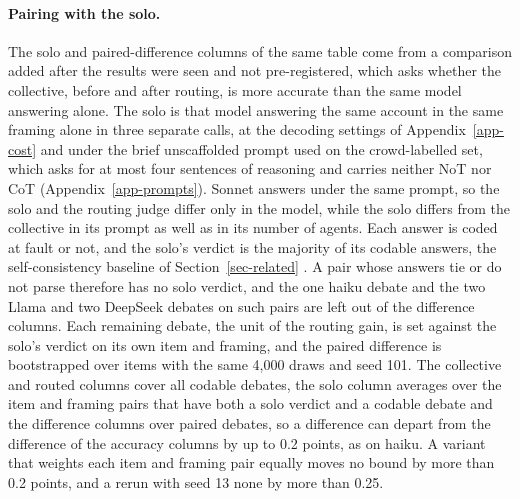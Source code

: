 \paragraph{Pairing with the solo.}
The solo and paired-difference columns of the same table come from a
comparison added after the results were seen and not pre-registered, which
asks whether the collective, before and after routing, is more accurate than
the same model answering alone. The solo is that model answering the same
account in the same framing alone in three separate calls, at the decoding
settings of Appendix~\ref{app-cost} and under the brief unscaffolded prompt
used on the crowd-labelled set, which asks for at most four sentences of
reasoning and carries neither NoT nor CoT (Appendix~\ref{app-prompts}).
Sonnet answers under the same prompt, so the solo and the routing judge
differ only in the model, while the solo differs from the collective in its
prompt as well as in its number of agents. Each answer is coded at fault or
not, and the solo's verdict is the majority of its codable answers, the
self-consistency baseline of Section~\ref{sec-related}
\citep{wang2023selfconsistency}. A pair whose answers tie or do not parse
therefore has no solo verdict, and the one haiku debate and the two Llama and
two DeepSeek debates on such pairs are left out of the difference columns.
Each remaining debate, the unit of the routing gain, is set against
the solo's verdict on its own item and framing, and the paired difference is
bootstrapped over items with the same 4,000 draws and seed 101. The
collective and routed columns cover all codable debates, the solo column
averages over the item and framing pairs that have both a solo verdict and a
codable debate and the difference columns over paired debates, so a
difference can depart from the difference of the accuracy columns by up to
0.2 points, as on haiku. A variant that weights each item and framing pair
equally moves no bound by more than 0.2 points, and a rerun with seed 13
none by more than 0.25.
